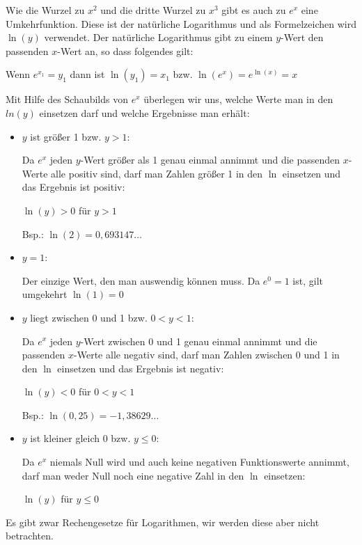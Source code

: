 Wie die Wurzel zu \(x^2\) und die dritte Wurzel zu \(x^3\) gibt es auch zu \(e^x\) eine Umkehrfunktion. Diese ist der natürliche Logarithmus und als Formelzeichen wird \(\ln(y)\) verwendet. Der natürliche Logarithmus gibt zu einem \(y\)-Wert den passenden \(x\)-Wert an, so dass folgendes gilt:
\begin{tcolorbox}\centering
	\textcolor{loestc}{Wenn \(e^{x_1}=y_1\) dann ist \(\ln(y_1)=x_1\) bzw. \(\ln(e^x)=e^{\ln(x)}=x\)}
\end{tcolorbox}
Mit Hilfe des Schaubilds von \(e^x\) überlegen wir uns, welche Werte man in den \(ln(y)\) einsetzen darf und welche Ergebnisse man erhält:

\begin{minipage}{\textwidth}\centering
    \iftoggle{qrcode}{
    \settototalheight{\imgheight}{\texttt{[image: \\eFkt/pics/ln.png]}}%
    \setlength{\qrheight}{2.5cm}%
    \texttt{[image: \\eFkt/pics/ln.png]}%
    \raisebox{\imgheight-\qrheight}{\makebox[0pt][r]{\href{https://www.geogebra.org/m/dduaugse}{\texttt{[image: \\eFkt/pics/natuerlicherLogarithmusQR.png]}}}}%
    }{
    \texttt{[image: \\eFkt/pics/ln.png]}}%
\end{minipage}\vspace{0.2cm}
\begin{itemize}
	\item \(y\) ist größer 1 bzw. \(y>1\):

	\textcolor{loes}{Da \(e^x\) jeden \(y\)-Wert größer als 1 genau einmal annimmt und die passenden \(x\)-Werte alle positiv sind, darf man Zahlen größer 1 in den \(\ln\) einsetzen und das Ergebnis ist positiv:}

	\textcolor{loes}{\(\ln(y)>0\) für \(y>1\)}

	\textcolor{loes}{Bsp.: \(\ln(2)=0,693147\dots\)}
	\item \(y=1\):

	\textcolor{loes}{Der einzige Wert, den man auswendig können muss. Da \(e^0=1\) ist, gilt umgekehrt \(\ln(1)=0\)}
	\item \(y\) liegt zwischen 0 und 1 bzw. \(0<y<1\):

	\textcolor{loes}{Da \(e^x\) jeden \(y\)-Wert zwischen 0 und 1 genau einmal annimmt und die passenden \(x\)-Werte alle negativ sind, darf man Zahlen zwischen 0 und 1 in den \(\ln\) einsetzen und das Ergebnis ist negativ:}

	\textcolor{loes}{\(\ln(y)<0\) für \(0<y<1\)}

	\textcolor{loes}{Bsp.: \(\ln(0,25)=-1,38629\dots\)}
	\item \(y\) ist kleiner gleich 0 bzw. \(y\leq0\):

	\textcolor{loes}{Da \(e^x\) niemals Null wird und auch keine negativen Funktionswerte annimmt, darf man weder Null noch eine negative Zahl in den \(\ln\) einsetzen:}

	\textcolor{loes}{\(\ln(y)\) \Lightning \normalsize für \(y\leq0\)}
\end{itemize}
\newpage
Es gibt zwar Rechengesetze für Logarithmen, wir werden diese aber nicht betrachten.

